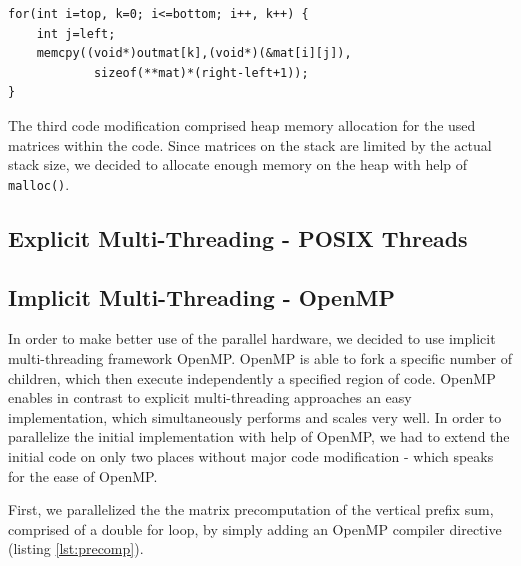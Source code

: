 \documentclass[conference]{IEEEtran}
\begin{document}
\begin{center}
   \begin{lstlisting}[captionpos=b, caption=Optimized Implementation: Initialize Output Matrix, label=lst:outmat-opt]  
for(int i=top, k=0; i<=bottom; i++, k++) {                                       
    int j=left;                                                                                    
    memcpy((void*)outmat[k],(void*)(&mat[i][j]),
            sizeof(**mat)*(right-left+1));                                          
}                                                 
   \end{lstlisting}
\end{center}
   
The third code modification comprised heap memory allocation for the used matrices within the code. Since matrices on the stack are limited by the actual stack size, we decided to allocate enough memory on the heap with help of \texttt{malloc()}.

   
\subsection{Explicit Multi-Threading - POSIX Threads}
\label{sec:impl:pthread}



\subsection{Implicit Multi-Threading - OpenMP}
\label{sec:impl:openmp}

In order to make better use of the parallel hardware, we decided to use implicit multi-threading framework OpenMP. OpenMP is able to fork a specific number of children, which then execute independently a specified region of code. OpenMP enables in contrast to explicit multi-threading approaches an easy implementation, which simultaneously performs and scales very well. In order to parallelize the initial implementation with help of OpenMP, we had to extend the initial code on only two places without major code modification - which speaks for the ease of OpenMP. 

First, we parallelized the the matrix precomputation of the vertical prefix sum, comprised of a double for loop, by simply adding an OpenMP compiler directive (listing \ref{lst:precomp}).
\end{document}
